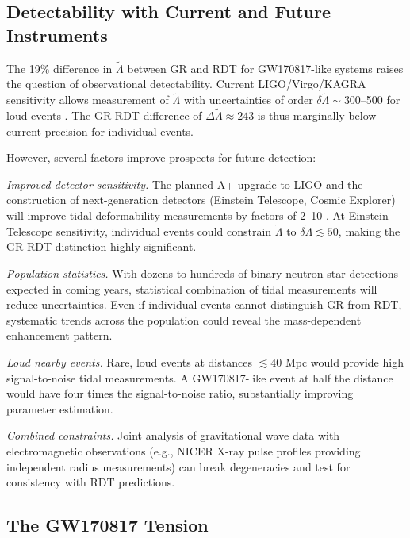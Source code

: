 \documentclass[twocolumn,showpacs,preprintnumbers,amsmath,amssymb,prd]{revtex4-2}
\begin{document}
\subsection{Detectability with Current and Future Instruments}
\label{sec:discussion_detectability}

The 19\% difference in $\tilde{\Lambda}$ between GR and RDT for GW170817-like systems raises the question of observational detectability. Current LIGO/Virgo/KAGRA sensitivity allows measurement of $\tilde{\Lambda}$ with uncertainties of order $\delta\tilde{\Lambda} \sim 300$--500 for loud events \cite{Abbott2018}. The GR-RDT difference of $\Delta\tilde{\Lambda} \approx 243$ is thus marginally below current precision for individual events.

However, several factors improve prospects for future detection:

\textit{Improved detector sensitivity.} The planned A+ upgrade to LIGO and the construction of next-generation detectors (Einstein Telescope, Cosmic Explorer) will improve tidal deformability measurements by factors of 2--10 \cite{Maggiore2020,Evans2021}. At Einstein Telescope sensitivity, individual events could constrain $\tilde{\Lambda}$ to $\delta\tilde{\Lambda} \lesssim 50$, making the GR-RDT distinction highly significant.

\textit{Population statistics.} With dozens to hundreds of binary neutron star detections expected in coming years, statistical combination of tidal measurements will reduce uncertainties. Even if individual events cannot distinguish GR from RDT, systematic trends across the population could reveal the mass-dependent enhancement pattern.

\textit{Loud nearby events.} Rare, loud events at distances $\lesssim 40$ Mpc would provide high signal-to-noise tidal measurements. A GW170817-like event at half the distance would have four times the signal-to-noise ratio, substantially improving parameter estimation.

\textit{Combined constraints.} Joint analysis of gravitational wave data with electromagnetic observations (e.g., NICER X-ray pulse profiles providing independent radius measurements) can break degeneracies and test for consistency with RDT predictions.

\subsection{The GW170817 Tension}
\label{sec:discussion_tension}
\end{document}
